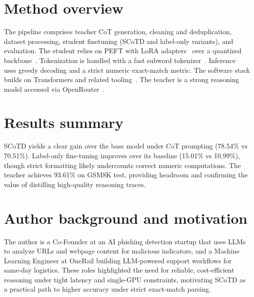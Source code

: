 \section*{Method overview}
The pipeline comprises teacher CoT generation, cleaning and deduplication, dataset processing, student finetuning (SCoTD and label-only variants), and evaluation. The student relies on PEFT with LoRA adapters~\cite{hu2021loralowrankadaptationlarge} over a quantized backbone~\cite{dettmers2023qloraefficientfinetuningquantized}. Tokenization is handled with a fast subword tokenizer~\cite{kudo2018sentencepiecesimplelanguageindependent,sennrich2016neuralmachinetranslationrare}. Inference uses greedy decoding and a strict numeric exact-match metric. The software stack builds on Transformers and related tooling~\cite{wolf2020huggingfacestransformersstateoftheartnatural}. The teacher is a strong reasoning model accessed via OpenRouter~\cite{openrouter}.

\section*{Results summary}
SCoTD yields a clear gain over the base model under CoT prompting (78.54\% vs 70.51\%). Label-only fine-tuning improves over its baseline (15.01\% vs 10.99\%), though strict formatting likely undercounts correct numeric computations. The teacher achieves 93.61\% on GSM8K test, providing headroom and confirming the value of distilling high-quality reasoning traces.

\section*{Author background and motivation}
The author is a Co-Founder at an AI phishing detection startup that uses LLMs to analyze URLs and webpage content for malicious indicators, and a Machine Learning Engineer at OneRail building LLM-powered support workflows for same-day logistics. These roles highlighted the need for reliable, cost-efficient reasoning under tight latency and single-GPU constraints, motivating SCoTD as a practical path to higher accuracy under strict exact-match parsing.